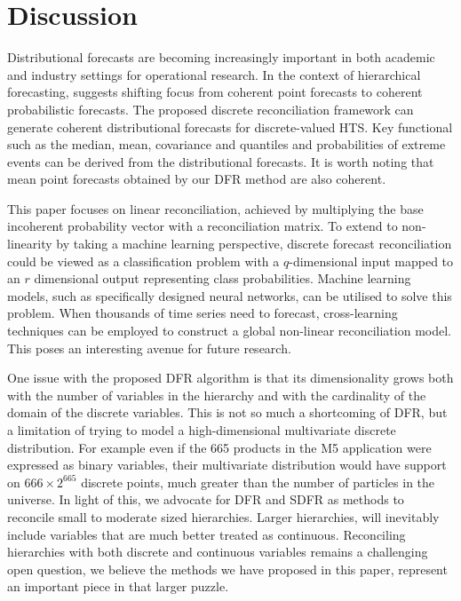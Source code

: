 \documentclass[a4paper,review,12pt,authoryear]{elsarticle}
\theoremstyle{definition}
\begin{document}
     \section{Discussion}
     \label{sec:discussion}



     Distributional forecasts are becoming increasingly important in both academic and industry settings for operational research. In the context of hierarchical forecasting, \cite{kolassaWeWantCoherent2022} suggests shifting focus from coherent point forecasts to coherent probabilistic forecasts.
     The proposed discrete reconciliation framework can generate coherent distributional forecasts for discrete-valued HTS.
     Key functional such as the median, mean, covariance and quantiles and probabilities of extreme events can be derived from the distributional forecasts.
     It is worth noting that mean point forecasts obtained by our DFR method are also coherent.

     This paper focuses on linear reconciliation, achieved by multiplying the base incoherent probability vector with a reconciliation matrix.
     To extend to non-linearity by taking a machine learning perspective, discrete forecast reconciliation could be viewed as a classification problem with a $q$-dimensional input mapped to an $r$ dimensional output representing class probabilities. Machine learning models, such as specifically designed neural networks, can be utilised to solve this problem.
     When thousands of time series need to forecast, cross-learning techniques can be employed to construct a global non-linear reconciliation model. This poses an interesting avenue for future research.

     One issue with the proposed DFR algorithm is that its dimensionality grows both with the number of variables in the hierarchy and with the cardinality of the domain of the discrete variables. This is not so much a shortcoming of DFR, but a limitation of trying to model a high-dimensional multivariate discrete distribution. For example even if the 665 products in the M5 application were expressed as binary variables, their multivariate distribution would have support on $666\times2^{665}$ discrete points, much greater than the number of particles in the universe. In light of this, we advocate for DFR and SDFR as methods to reconcile small to moderate sized hierarchies. Larger hierarchies, will inevitably include variables that are much better treated as continuous. Reconciling hierarchies with both discrete and continuous variables remains a challenging open question, we believe the methods we have proposed in this paper, represent an important piece in that larger puzzle.
     
\end{document}
